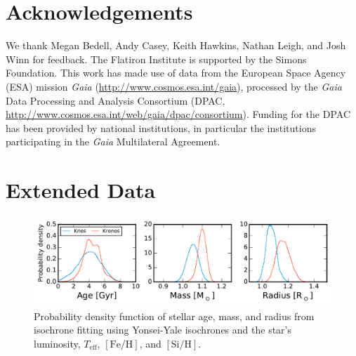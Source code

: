 \documentclass[12pt,letterpaper,margin=1in]{article}
\newcommand*\elem[1]{\ensuremath{\mathrm{#1}}}
\newcommand*\elemH[1]{\ensuremath{[\mathrm{#1}/\elem{H}]}}
\newcommand*\teff{\ensuremath{T_\mathrm{eff}}}
\newcommand*{\feh}{\ensuremath{\elemH{Fe}}}
\begin{document}
\section{Acknowledgements}
We thank Megan Bedell, Andy Casey, Keith Hawkins, Nathan Leigh, and Josh Winn
for feedback.
The Flatiron Institute is supported by the Simons Foundation.
This work has made use of data from the European Space Agency (ESA) mission
{\it Gaia} (\url{http://www.cosmos.esa.int/gaia}), processed by the {\it Gaia}
Data Processing and Analysis Consortium (DPAC,
\url{http://www.cosmos.esa.int/web/gaia/dpac/consortium}). Funding for the DPAC
has been provided by national institutions, in particular the institutions
participating in the {\it Gaia} Multilateral Agreement.


\section{Extended Data}

\begin{figure}[htpb]
  \centering
  \includegraphics[width=0.95\linewidth]{yyisofitting.pdf}
  \caption{Probability density function of stellar age, mass, and radius
    from isochrone fitting using Yonsei-Yale isochrones\cite{2013ApJ...776...87S}
    and the star's luminosity, \teff, \feh, and \elemH{Si}.
  }
  \label{fig:yyisofitting}
\end{figure}
\end{document}
